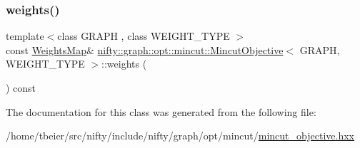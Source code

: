 \subsubsection{\texorpdfstring{weights()}{weights()}\hspace{0.1cm}{\footnotesize\ttfamily [2/2]}}
{\footnotesize\ttfamily template$<$class G\+R\+A\+PH , class W\+E\+I\+G\+H\+T\+\_\+\+T\+Y\+PE $>$ \\
const \hyperlink{classnifty_1_1graph_1_1opt_1_1mincut_1_1MincutObjective_a012cbd01da7133bf0824f41af40adafb}{Weights\+Map}\& \hyperlink{classnifty_1_1graph_1_1opt_1_1mincut_1_1MincutObjective}{nifty\+::graph\+::opt\+::mincut\+::\+Mincut\+Objective}$<$ G\+R\+A\+PH, W\+E\+I\+G\+H\+T\+\_\+\+T\+Y\+PE $>$\+::weights (\begin{DoxyParamCaption}{ }\end{DoxyParamCaption}) const\hspace{0.3cm}{\ttfamily [inline]}}



The documentation for this class was generated from the following file\+:\begin{DoxyCompactItemize}
\item 
/home/tbeier/src/nifty/include/nifty/graph/opt/mincut/\hyperlink{graph_2opt_2mincut_2mincut__objective_8hxx}{mincut\+\_\+objective.\+hxx}\end{DoxyCompactItemize}
